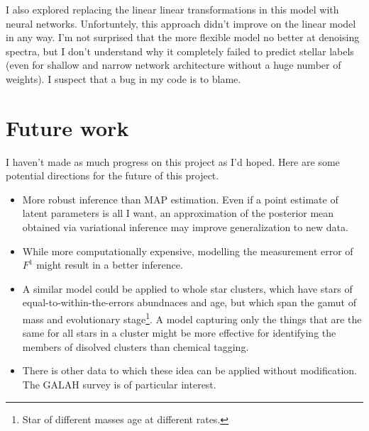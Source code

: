 \documentclass[12pt]{article}
\begin{document}
I also explored replacing the linear linear transformations in this model with neural networks.
Unfortuntely, this approach didn't improve on the linear model in any way.
I'm not surprised that the more flexible model no better at denoising spectra, but I don't understand why it completely failed to predict stellar labels (even for shallow and narrow network architecture without a huge number of weights).
I suspect that a bug in my code is to blame.


\section{Future work}
I haven't made as much progress on this project as I'd hoped.  Here are some potential directions for the future of this project.
\begin{itemize}
    \item More robust inference than MAP estimation.  Even if a point estimate of latent parameters is all I want, an approximation of the posterior mean obtained via variational inference may improve generalization to new data.
    \item While more computationally expensive, modelling the measurement error of $F^1$ might result in a better inference.
    \item A similar model could be applied to whole star clusters, which have stars of equal-to-within-the-errors abundnaces and age, but which span the gamut of mass and evolutionary stage\footnote{Star of different masses age at different rates.}.
          A model capturing only the things that are the same for all stars in a cluster might be more effective for identifying the members of disolved clusters than chemical tagging.
    \item There is other data to which these idea can be applied without modification.  The GALAH survey is of particular interest.
\end{itemize}
\end{document}
